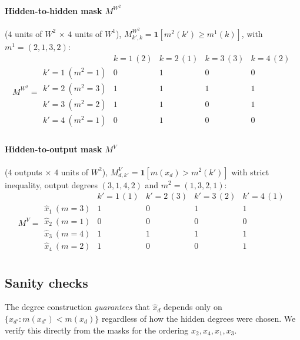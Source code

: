\documentclass[11pt]{article}
\begin{document}
\paragraph{Hidden-to-hidden mask $M^{W^2}$} ($4$ units of $W^2$ $\times$ $4$
units of $W^1$), $M^{W^2}_{k',k} = \mathbf{1}[m^2(k') \ge m^1(k)]$, with
$m^1=(2,1,3,2)$:
\[
M^{W^2} =
\begin{array}{r|cccc}
 & k{=}1\,(2) & k{=}2\,(1) & k{=}3\,(3) & k{=}4\,(2) \\ \hline
  k'{=}1\ (m^2{=}1) & 0 & 1 & 0 & 0 \\
  k'{=}2\ (m^2{=}3) & 1 & 1 & 1 & 1 \\
  k'{=}3\ (m^2{=}2) & 1 & 1 & 0 & 1 \\
  k'{=}4\ (m^2{=}1) & 0 & 1 & 0 & 0 \\
\end{array}
\]

\paragraph{Hidden-to-output mask $M^V$} ($4$ outputs $\times$ $4$ units of
$W^2$), $M^{V}_{d,k'} = \mathbf{1}[m(x_d) > m^2(k')]$ with strict inequality,
output degrees $(3,1,4,2)$ and $m^2 = (1,3,2,1)$:
\[
M^{V} =
\begin{array}{r|cccc}
 & k'{=}1\,(1) & k'{=}2\,(3) & k'{=}3\,(2) & k'{=}4\,(1) \\ \hline
  \hat x_1\ (m{=}3) & 1 & 0 & 1 & 1 \\
  \hat x_2\ (m{=}1) & 0 & 0 & 0 & 0 \\
  \hat x_3\ (m{=}4) & 1 & 1 & 1 & 1 \\
  \hat x_4\ (m{=}2) & 1 & 0 & 0 & 1 \\
\end{array}
\]

\subsection*{Sanity checks}

The degree construction \emph{guarantees} that $\hat x_d$ depends only on
$\{x_{d'} : m(x_{d'}) < m(x_d)\}$ regardless of how the hidden degrees were
chosen. We verify this directly from the masks for the ordering
$x_2, x_4, x_1, x_3$.
\end{document}
